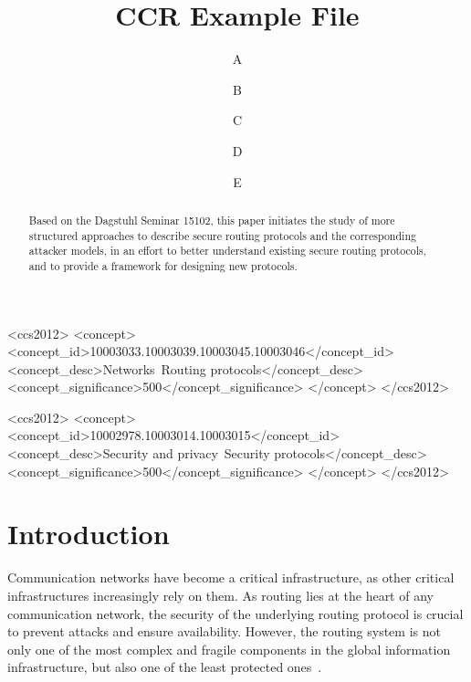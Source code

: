 \documentclass[sigconf]{acmart}
\begin{document}
\title{CCR Example File}

\author{A}

\author{B}

\author{C}

\author{D}

\author{E}

\begin{abstract}
	Based on the Dagstuhl Seminar 15102,
	this paper initiates the study of more structured approaches to
	describe secure routing protocols and the corresponding attacker models,
	in an effort to better understand existing secure routing protocols,
	and to provide a framework for designing new protocols.
\end{abstract}

\begin{CCSXML}
	<ccs2012>
	<concept>
	<concept_id>10003033.10003039.10003045.10003046</concept_id>
	<concept_desc>Networks~Routing protocols</concept_desc>
	<concept_significance>500</concept_significance>
	</concept>
	</ccs2012>
\end{CCSXML}

\begin{CCSXML}
	<ccs2012>
	<concept>
	<concept_id>10002978.10003014.10003015</concept_id>
	<concept_desc>Security and privacy~Security protocols</concept_desc>
	<concept_significance>500</concept_significance>
	</concept>
	</ccs2012>
\end{CCSXML}



\maketitle

\section{Introduction}\label{sec:intro}

Communication networks have become a critical infrastructure, as other critical
infrastructures increasingly rely on them.
As routing lies at the heart of
any communication network,
the security of the underlying
routing protocol is crucial
to prevent attacks and ensure availability.
However, the routing system is not only one
of the most complex and fragile components in the
global information infrastructure, but also
one of the least protected ones~\cite{route-infra}.
\end{document}
